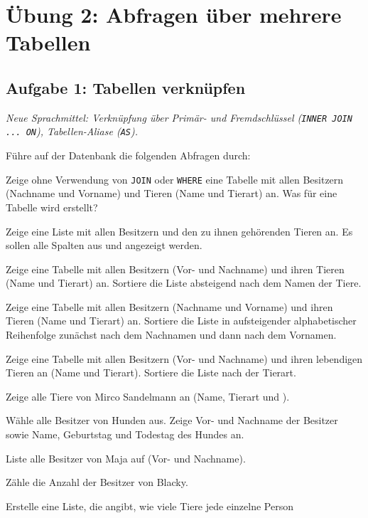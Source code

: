 \clearpage

\section{Übung 2: Abfragen über mehrere Tabellen}

\subsection{Aufgabe 1: Tabellen verknüpfen \tagPflicht}
\noindent \emph{Neue Sprachmittel: Verknüpfung über Primär- und Fremdschlüssel (\texttt{INNER JOIN ... ON}), Tabellen-Aliase (\texttt{AS}).}

Führe auf der Datenbank  die folgenden Abfragen durch:

\begin{compactenum}[a)]
\item Zeige ohne Verwendung von \lstinline|JOIN| oder \lstinline|WHERE| eine
Tabelle mit allen Besitzern (Nachname und Vorname) und Tieren (Name und
Tierart) an. Was für eine Tabelle wird erstellt?
\item Zeige eine Liste mit allen Besitzern und den zu ihnen gehörenden Tieren
an. Es sollen alle Spalten aus  und 
angezeigt werden.
\item Zeige eine Tabelle mit allen Besitzern (Vor- und Nachname) und ihren
Tieren (Name und Tierart) an. Sortiere die Liste absteigend nach dem Namen der
Tiere.
\item Zeige eine Tabelle mit allen Besitzern (Nachname und Vorname) und ihren
Tieren (Name und Tierart) an. Sortiere die Liste in aufsteigender
alphabetischer Reihenfolge zunächst nach dem Nachnamen und dann nach dem
Vornamen.
\item Zeige eine Tabelle mit allen Besitzern (Vor- und Nachname) und ihren
lebendigen Tieren an (Name und Tierart). Sortiere die Liste nach der Tierart.
\item Zeige alle Tiere von Mirco Sandelmann an (Name, Tierart und
).
\item Wähle alle Besitzer von Hunden aus. Zeige Vor- und Nachname der Besitzer
sowie Name, Geburtstag und Todestag des Hundes an.
\item Liste alle Besitzer von Maja auf (Vor- und Nachname).
\item Zähle die Anzahl der Besitzer von Blacky.
\item Erstelle eine Liste, die angibt, wie viele Tiere jede einzelne Person

\end{compactenum}
